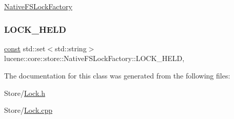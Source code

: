 \mbox{\hyperlink{classlucene_1_1core_1_1store_1_1NativeFSLockFactory}{Native\+F\+S\+Lock\+Factory}} \mbox{\label{classlucene_1_1core_1_1store_1_1NativeFSLockFactory_afe6f909fde9f0907977c787d8838dd7b}} 
\subsubsection{\texorpdfstring{L\+O\+C\+K\+\_\+\+H\+E\+LD}{LOCK\_HELD}}
{\footnotesize\ttfamily \mbox{\hyperlink{ZlibCrc32_8h_a2c212835823e3c54a8ab6d95c652660e}{const}} std\+::set$<$std\+::string$>$ lucene\+::core\+::store\+::\+Native\+F\+S\+Lock\+Factory\+::\+L\+O\+C\+K\+\_\+\+H\+E\+LD\hspace{0.3cm}{\ttfamily [static]}, {\ttfamily [private]}}



The documentation for this class was generated from the following files\+:\begin{DoxyCompactItemize}
\item 
Store/\mbox{\hyperlink{Lock_8h}{Lock.\+h}}\item 
Store/\mbox{\hyperlink{Lock_8cpp}{Lock.\+cpp}}\end{DoxyCompactItemize}
